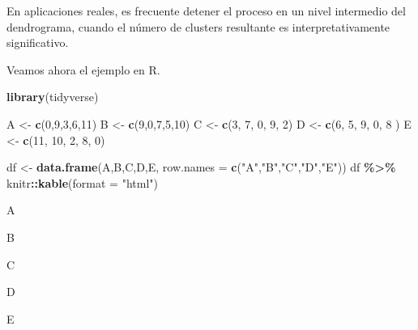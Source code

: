 \documentclass[
]{book}
\newenvironment{Shaded}{\begin{snugshade}}{\end{snugshade}}
\newcommand{\AttributeTok}[1]{\textcolor[rgb]{0.13,0.29,0.53}{#1}}
\newcommand{\DecValTok}[1]{\textcolor[rgb]{0.00,0.00,0.81}{#1}}
\newcommand{\FunctionTok}[1]{\textcolor[rgb]{0.13,0.29,0.53}{\textbf{#1}}}
\newcommand{\NormalTok}[1]{#1}
\newcommand{\OtherTok}[1]{\textcolor[rgb]{0.56,0.35,0.01}{#1}}
\newcommand{\SpecialCharTok}[1]{\textcolor[rgb]{0.81,0.36,0.00}{\textbf{#1}}}
\newcommand{\StringTok}[1]{\textcolor[rgb]{0.31,0.60,0.02}{#1}}
\begin{document}
En aplicaciones reales, es frecuente detener el proceso en un nivel intermedio del dendrograma, cuando el número de clusters resultante es interpretativamente significativo.

Veamos ahora el ejemplo en R.

\begin{Shaded}
\begin{Highlighting}[]
\FunctionTok{library}\NormalTok{(tidyverse)}
\end{Highlighting}
\end{Shaded}

\begin{Shaded}
\begin{Highlighting}[]
\NormalTok{A }\OtherTok{\textless{}{-}} \FunctionTok{c}\NormalTok{(}\DecValTok{0}\NormalTok{,}\DecValTok{9}\NormalTok{,}\DecValTok{3}\NormalTok{,}\DecValTok{6}\NormalTok{,}\DecValTok{11}\NormalTok{)}
\NormalTok{B }\OtherTok{\textless{}{-}} \FunctionTok{c}\NormalTok{(}\DecValTok{9}\NormalTok{,}\DecValTok{0}\NormalTok{,}\DecValTok{7}\NormalTok{,}\DecValTok{5}\NormalTok{,}\DecValTok{10}\NormalTok{)}
\NormalTok{C }\OtherTok{\textless{}{-}} \FunctionTok{c}\NormalTok{(}\DecValTok{3}\NormalTok{, }\DecValTok{7}\NormalTok{, }\DecValTok{0}\NormalTok{, }\DecValTok{9}\NormalTok{, }\DecValTok{2}\NormalTok{)}
\NormalTok{D }\OtherTok{\textless{}{-}} \FunctionTok{c}\NormalTok{(}\DecValTok{6}\NormalTok{, }\DecValTok{5}\NormalTok{, }\DecValTok{9}\NormalTok{, }\DecValTok{0}\NormalTok{, }\DecValTok{8}\NormalTok{ )}
\NormalTok{E }\OtherTok{\textless{}{-}} \FunctionTok{c}\NormalTok{(}\DecValTok{11}\NormalTok{, }\DecValTok{10}\NormalTok{, }\DecValTok{2}\NormalTok{, }\DecValTok{8}\NormalTok{, }\DecValTok{0}\NormalTok{)}

\NormalTok{df }\OtherTok{\textless{}{-}} \FunctionTok{data.frame}\NormalTok{(A,B,C,D,E, }\AttributeTok{row.names =} \FunctionTok{c}\NormalTok{(}\StringTok{"A"}\NormalTok{,}\StringTok{"B"}\NormalTok{,}\StringTok{"C"}\NormalTok{,}\StringTok{"D"}\NormalTok{,}\StringTok{"E"}\NormalTok{))}
\NormalTok{df }\SpecialCharTok{\%\textgreater{}\%}\NormalTok{ knitr}\SpecialCharTok{::}\FunctionTok{kable}\NormalTok{(}\AttributeTok{format =} \StringTok{"html"}\NormalTok{)}
\end{Highlighting}
\end{Shaded}

A

B

C

D

E
\end{document}
